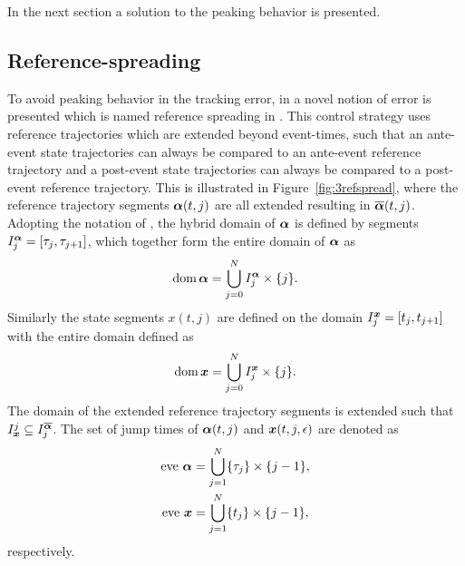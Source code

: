 \documentclass[../DC2017114Bouma.tex]{subfiles}
\begin{document}
In the next section a solution to the peaking behavior is presented.
%
%
%
%
%
\subsection{Reference-spreading}
To avoid peaking behavior in the tracking error, in \cite{Saccon2014} a novel notion of error is presented which is named reference spreading in \cite{Rijnen2016}. This control strategy uses reference trajectories which are extended beyond event-times, such that an ante-event state trajectories can always be compared to an ante-event reference trajectory and a post-event state trajectories can always be compared to a post-event reference trajectory. This is illustrated in Figure~\ref{fig:3refspread}, where the reference trajectory segments $\boldsymbol{\alpha}(t,j)$ are all extended resulting in $\overline{\boldsymbol{\alpha}}(t,j)$. Adopting the notation of \cite{Goebel2009}, the hybrid domain of $\boldsymbol{\alpha}$ is defined by segments $I_j^{\boldsymbol{\alpha}} = [\tau_j,\tau_{j+1}]$, which together form the entire domain of $\boldsymbol{\alpha}$ as
\begin{align}
\operatorname{\textnormal{dom}}\boldsymbol{\alpha} = \bigcup^N_{j=0}I^{\boldsymbol{\alpha}}_j\times\{j\}.
\end{align}
%
Similarly the state segments $x(t,j)$ are defined on the domain $I_j^{\boldsymbol{x}} = [t_j,t_{j+1}]$ with the entire domain defined as
\begin{align}
\operatorname{\textnormal{dom}}{\boldsymbol{x}} = \bigcup^N_{j=0}I^{{\boldsymbol{x}}}_j\times\{j\}.
\end{align}
The domain of the extended reference trajectory segments is extended such that $I_{{\boldsymbol{x}}}^j\subseteq I^{\overline{\boldsymbol{\alpha}}}_j$. The set of jump times of $\boldsymbol{\alpha}(t,j)$ and ${\boldsymbol{x}}(t,j,\epsilon)$ are denoted as
\begin{align}
\text{eve}\ \boldsymbol{\alpha} &= \bigcup_{j=1}^N \{\tau_j\}\times\{j-1\},\\
\text{eve}\ {\boldsymbol{x}} &= \bigcup_{j=1}^N \{t_j\}\times\{j-1\},
\end{align}
respectively.
\end{document}
